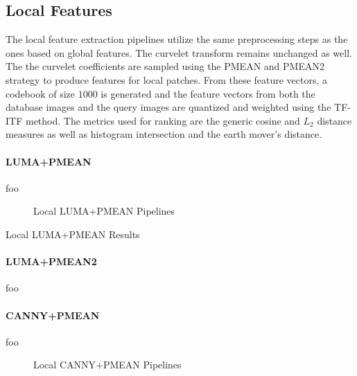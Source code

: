 \subsection{Local Features}

The local feature extraction pipelines utilize the same preprocessing steps as
the ones based on global features. The curvelet transform remains unchanged as
well. The the curvelet coefficients are sampled using the PMEAN and PMEAN2
strategy to produce features for local patches. From these feature vectors, a
codebook of size $1000$ is generated and the feature vectors from both the
database images and the query images are quantized and weighted using the
TF-ITF method. The metrics used for ranking are the generic cosine and $L_2$
distance measures as well as histogram intersection and the earth mover's
distance.

\paragraph{LUMA+PMEAN}

foo

\begin{figure}[h]
    \centering
    
    \caption[Local LUMA+PMEAN Pipelines]{
        Local LUMA+PMEAN Pipelines
    }
    \label{fig:pipeline_local_luma_pmean}
\end{figure}

\begin{table}[h]
    \centering
    
    \caption[Local LUMA+PMEAN Results]{
        Local LUMA+PMEAN Results
    }
    \label{tab:results_local_luma_pmean}
\end{table}

\paragraph{LUMA+PMEAN2}

foo

\paragraph{CANNY+PMEAN}

foo

\begin{figure}[h]
    \centering
    
    \caption[Local CANNY+PMEAN Pipelines]{
        Local CANNY+PMEAN Pipelines
    }
    \label{fig:pipeline_local_luma_canny_pmean}
\end{figure}

